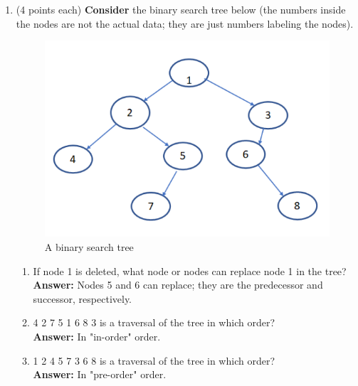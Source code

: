\documentclass[12pt, a4paper]{article}
\newcommand{\squeezeup}{\vspace{-16pt}}%
\begin{document}
\begin{enumerate}
    \item (4 points each) \textbf{Consider} the binary search tree below
        (the numbers inside the nodes are not the actual data; they are just numbers labeling the nodes).
    \begin{figure}[H]
        \includegraphics[max width=\textwidth/2, center]{"5.png"}
        \caption{A binary search tree}
        \label{fig:5-BST}
    \end{figure}\squeezeup

    \begin{enumerate}

        \item If node 1 is deleted, what node or nodes can replace node 1 in the tree? \\
        \hspace*{\fill} \textbf{Answer:} Nodes 5 and 6 can replace; they are the predecessor and successor, respectively.
        
        \item 4 2 7 5 1 6 8 3 is a traversal of the tree in which order? \\
        \hspace*{\fill} \textbf{Answer:} In "in-order" order.
        
        \item 1 2 4 5 7 3 6 8 is a traversal of the tree in which order? \\
        \hspace*{\fill} \textbf{Answer:} In "pre-order" order.
    
    \end{enumerate}




\end{enumerate}
\end{document}
